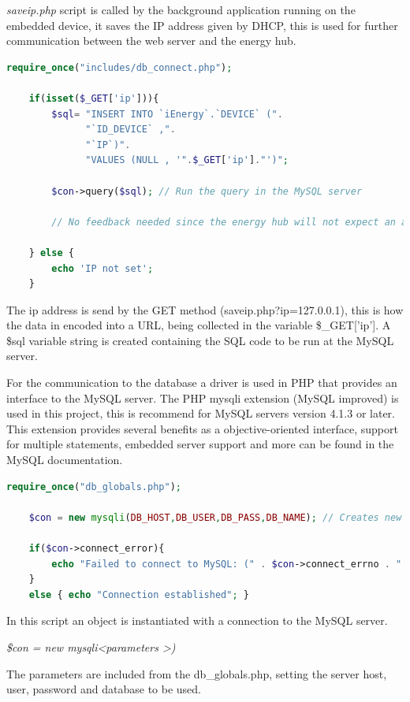 \textit{saveip.php} script is called by the background application running on the embedded device, it saves the IP address given by DHCP, this is used for further communication between the web server and the energy hub.
\begin{lstlisting}[language=php]
	require_once("includes/db_connect.php");

	if(isset($_GET['ip'])){
		$sql= "INSERT INTO `iEnergy`.`DEVICE` (".
			  "`ID_DEVICE` ,".
		  	  "`IP`)".
		  	  "VALUES (NULL , '".$_GET['ip']."')";
	
		$con->query($sql); // Run the query in the MySQL server
		
		// No feedback needed since the energy hub will not expect an answer.
		
	} else {
		echo 'IP not set';
	}
\end{lstlisting}
The ip address is send by the GET method (saveip.php?ip=127.0.0.1), this is how the data in encoded into a URL, being collected in the variable \$\_GET['ip']. 
A \$sql variable string is created containing the SQL code to be run at the MySQL server.


For the communication to the database a driver is used in PHP that provides an interface to the MySQL server. The PHP mysqli extension (MySQL improved) is used in this project, this is recommend for MySQL servers version 4.1.3 or later. This extension provides several benefits as a objective-oriented interface, support for multiple statements, embedded server support and more can be found in the MySQL documentation.

\begin{lstlisting}[language=php]
	require_once("db_globals.php");
	
	$con = new mysqli(DB_HOST,DB_USER,DB_PASS,DB_NAME); // Creates new mysql connection
	
	if($con->connect_error){
		echo "Failed to connect to MySQL: (" . $con->connect_errno . " ) ". $con->connect_error;
	} 
	else { echo "Connection established"; }
\end{lstlisting}

In this script an object is instantiated with a connection to the MySQL server.

\textit{\$con = new mysqli\textless parameters \textgreater)}

The parameters are included from the db\_globals.php, setting the server host, user, password and database to be used.

